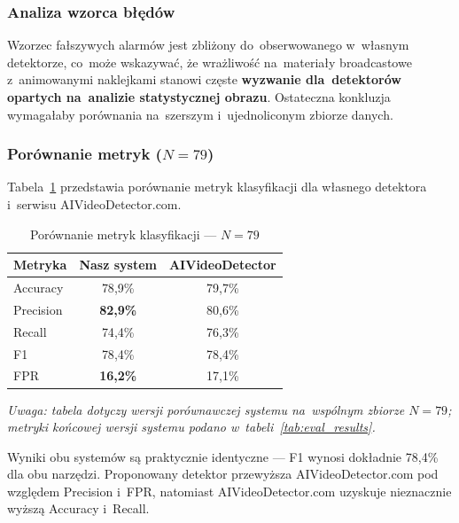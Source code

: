 \subsubsection{Analiza wzorca b\l{}\k{e}d\'{o}w}

Wzorzec fa\l{}szywych alarm\'{o}w jest zbli\.{z}ony do~obserwowanego
w~w\l{}asnym detektorze, co~mo\.{z}e wskazywa\'{c}, \.{z}e wra\.{z}liwo\'{s}\'{c}
na~materia\l{}y broadcastowe z~animowanymi naklejkami
stanowi cz\k{e}ste \textbf{wyzwanie dla~detektor\'{o}w opartych
na~analizie statystycznej obrazu}.
Ostateczna konkluzja wymaga\l{}aby por\'{o}wnania na~szerszym
i~ujednoliconym zbiorze danych.

\subsubsection{Por\'{o}wnanie metryk ($N=79$)}

Tabela~\ref{tab:metryki_ogolne} przedstawia por\'{o}wnanie metryk
klasyfikacji dla w\l{}asnego detektora i~serwisu AIVideoDetector.com.

\begin{table}[htbp]
\centering
{\setlength{\tabcolsep}{10pt}\renewcommand{\arraystretch}{1.3}
\caption{Por\'{o}wnanie metryk klasyfikacji --- $N=79$}
\label{tab:metryki_ogolne}
\small
\begin{tabular}{lcc}
\toprule
\textbf{Metryka} & \textbf{Nasz system} & \textbf{AIVideoDetector} \\
\midrule
Accuracy  & 78{,}9\% & 79{,}7\% \\
Precision & \textbf{82{,}9\%} & 80{,}6\% \\
Recall    & 74{,}4\% & 76{,}3\% \\
F1        & 78{,}4\% & 78{,}4\% \\
FPR       & \textbf{16{,}2\%} & 17{,}1\% \\
\bottomrule
\end{tabular}}
\end{table}

\noindent\textit{Uwaga: tabela dotyczy wersji porównawczej systemu na~wspólnym zbiorze
$N=79$; metryki końcowej wersji systemu podano w~tabeli~\ref{tab:eval_results}.}

Wyniki obu system\'{o}w s\k{a} praktycznie identyczne ---
F1 wynosi dok\l{}adnie 78{,}4\% dla obu narz\k{e}dzi.
Proponowany detektor przewy\.{z}sza AIVideoDetector.com
pod wzgl\k{e}dem Precision i~FPR, natomiast AIVideoDetector.com
uzyskuje nieznacznie wy\.{z}sz\k{a} Accuracy i~Recall.

